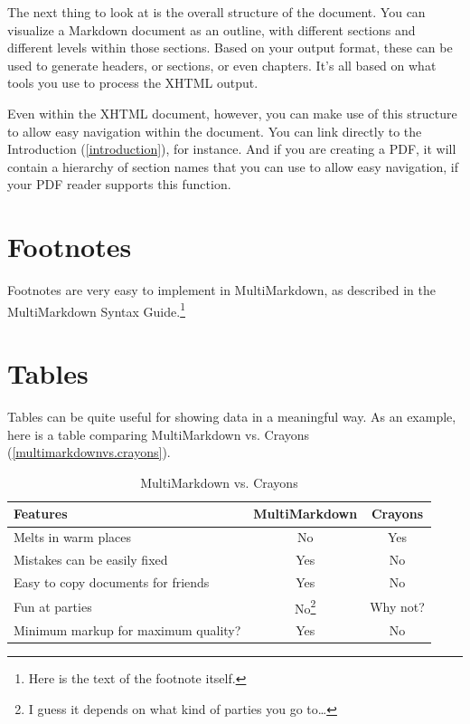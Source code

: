 \documentclass[oneside,article]{memoir}
\begin{document}
The next thing to look at is the overall structure of the document. You can
visualize a Markdown document as an outline, with different sections and
different levels within those sections. Based on your output format, these can
be used to generate headers, or sections, or even chapters. It's all based on
what tools you use to process the XHTML output.


Even within the XHTML document, however, you can make use of this structure to
allow easy navigation within the document. You can link directly to the
Introduction (\autoref{introduction}), for instance. And if you are creating a PDF, it will contain
a hierarchy of section names that you can use to allow easy navigation, if
your PDF reader supports this function.


\section{Footnotes}
\label{footnotes}

Footnotes are very easy to implement in MultiMarkdown, as described in the
MultiMarkdown Syntax Guide.\footnote{Here is the text of the footnote itself.}


\section{Tables}
\label{tables}

Tables can be quite useful for showing data in a meaningful way. As an
example, here is a table comparing MultiMarkdown vs. Crayons (\autoref{multimarkdownvs.crayons}).


\begin{table}[htbp]
\begin{minipage}{\linewidth}
\setlength{\tymax}{0.5\linewidth}
\centering
\small
\caption{MultiMarkdown vs. Crayons}
\label{multimarkdownvs.crayons}
\begin{tabulary}{\linewidth}{@{}lcc@{}} \\ \toprule 
Features&MultiMarkdown&Crayons \\\midrule
Melts in warm places&No&Yes \\
Mistakes can be easily fixed&Yes&No \\
Easy to copy documents for friends&Yes&No \\
Fun at parties&No\footnote{I guess it depends on what kind of parties you go to{\ldots}}&Why not? \\

		\bottomrule
	Minimum markup for maximum quality?&Yes&No \\

		\bottomrule
	\end{tabulary}
\end{minipage}
\end{table}
\end{document}
